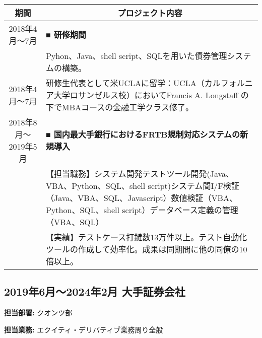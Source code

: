 \documentclass[uplatex,a4j,10.5pt,dvipdfmx]{jsarticle}
\begin{document}
\begin{longtable}{|c|p{14cm}|}
	\hline
	\multicolumn{1}{|c|}{\textbf{期間}} & \multicolumn{1}{c|}{\textbf{プロジェクト内容}}                                                                                                         \\
	\hline
	\endhead

	\hline
	2018年4月～7月                        & \textbf{■ 研修期間}                                                                                                                                \\
	                                  & Pyhon、Java、shell script、SQLを用いた債券管理システムの構築。                                                                                                    \\
	\hline
	2018年4月～7月                        & 研修生代表として米UCLAに留学：UCLA（カルフォルニア大学ロサンゼルス校）においてFrancis A. Longstaff の下でMBAコースの金融工学クラス修了。                                                           \\
	\hline
	2018年8月～2019年5月                   & \textbf{■ 国内最大手銀行におけるFRTB規制対応システムの新規導入}                                                                                                        \\
	                                  & 【担当職務】システム開発テストツール開発(Java、VBA、Python、SQL、shell script)システム間I/F検証（Java、VBA、SQL、Javascript）数値検証（VBA、Python、SQL、shell script）データベース定義の管理（VBA、SQL） \\
	                                  & 【実績】テストケース打鍵数13万件以上。テスト自動化ツールの作成して効率化。成果は同期間に他の同僚の10倍以上。                                                                                       \\
	\hline
\end{longtable}

\subsection{2019年6月～2024年2月 大手証券会社}

\noindent\textbf{担当部署:} クオンツ部

\noindent\textbf{担当業務:} エクイティ・デリバティブ業務周り全般
\end{document}
